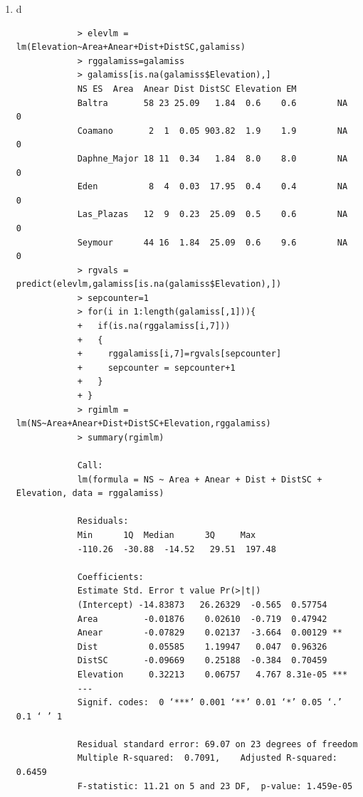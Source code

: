 \documentclass[11pt]{article}
\begin{document}
\begin{enumerate}
\begin{enumerate}
\begin{enumerate}
		\item d
		\begin{verbatim}
			> elevlm = lm(Elevation~Area+Anear+Dist+DistSC,galamiss)
			> rggalamiss=galamiss
			> galamiss[is.na(galamiss$Elevation),]
			NS ES  Area  Anear Dist DistSC Elevation EM
			Baltra       58 23 25.09   1.84  0.6    0.6        NA  0
			Coamano       2  1  0.05 903.82  1.9    1.9        NA  0
			Daphne_Major 18 11  0.34   1.84  8.0    8.0        NA  0
			Eden          8  4  0.03  17.95  0.4    0.4        NA  0
			Las_Plazas   12  9  0.23  25.09  0.5    0.6        NA  0
			Seymour      44 16  1.84  25.09  0.6    9.6        NA  0
			> rgvals = predict(elevlm,galamiss[is.na(galamiss$Elevation),])
			> sepcounter=1
			> for(i in 1:length(galamiss[,1])){
			+   if(is.na(rggalamiss[i,7]))
			+   {
			+     rggalamiss[i,7]=rgvals[sepcounter]
			+     sepcounter = sepcounter+1
			+   }
			+ }
			> rgimlm = lm(NS~Area+Anear+Dist+DistSC+Elevation,rggalamiss)
			> summary(rgimlm)
			
			Call:
			lm(formula = NS ~ Area + Anear + Dist + DistSC + Elevation, data = rggalamiss)
			
			Residuals:
			Min      1Q  Median      3Q     Max 
			-110.26  -30.88  -14.52   29.51  197.48 
			
			Coefficients:
			Estimate Std. Error t value Pr(>|t|)    
			(Intercept) -14.83873   26.26329  -0.565  0.57754    
			Area         -0.01876    0.02610  -0.719  0.47942    
			Anear        -0.07829    0.02137  -3.664  0.00129 ** 
			Dist          0.05585    1.19947   0.047  0.96326    
			DistSC       -0.09669    0.25188  -0.384  0.70459    
			Elevation     0.32213    0.06757   4.767 8.31e-05 ***
			---
			Signif. codes:  0 ‘***’ 0.001 ‘**’ 0.01 ‘*’ 0.05 ‘.’ 0.1 ‘ ’ 1
			
			Residual standard error: 69.07 on 23 degrees of freedom
			Multiple R-squared:  0.7091,	Adjusted R-squared:  0.6459 
			F-statistic: 11.21 on 5 and 23 DF,  p-value: 1.459e-05
			

\end{verbatim}
\end{enumerate}
\end{enumerate}
\end{enumerate}
\end{document}

